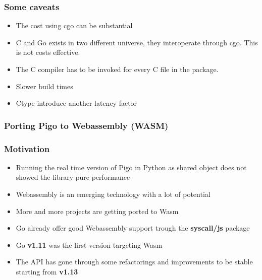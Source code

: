\documentclass[9pt]{beamer}
\begin{document}
\begin{frame}[fragile]
\frametitle{Some caveats}


\begin{itemize}
\item The cost using cgo can be substantial
\item C and Go exists in two different universe, they interoperate through cgo. This is not costs effective.
\item The C compiler has to be invoked for every C file in the package.
\item Slower build times
\item Ctype introduce another latency factor
\end{itemize}


\end{frame}

\begin{frame}[fragile]
\frametitle{Porting Pigo to Webassembly (WASM)}


\end{frame}

\begin{frame}[fragile]
\frametitle{Motivation}


\begin{itemize}
\item Running the real time version of Pigo in Python as shared object does not showed the library pure performance
\item Webassembly is an emerging technology with a lot of potential
\item More and more projects are getting ported to Wasm
\item Go already offer good Webassembly support trough the \textbf{syscall/js} package
\item Go \textbf{v1.11} was the first version targeting Wasm
\item The API has gone through some refactorings and improvements to be stable starting from \textbf{v1.13}
\end{itemize}


\end{frame}
\end{document}

